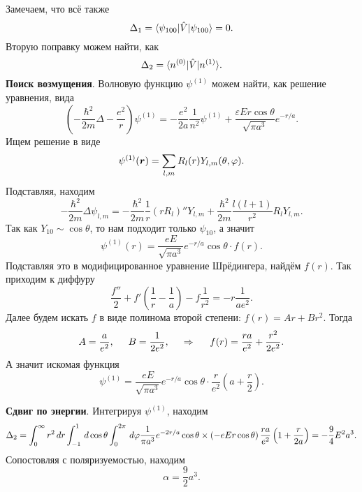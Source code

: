Замечаем, что всё также
\begin{equation*}
    \Delta_1  = \bk{\psi_{100}}[\hat{V}]{\psi_{100}} = 0.
\end{equation*}
Вторую поправку можем найти, как
\begin{equation*}
    \Delta_2 = \bk{n^{(0)}}[\hat{V}]{n^{(1)}}.
\end{equation*}
\textbf{Поиск возмущения}. Волновую функцию $\psi^{(1)}$ можем найти, как решение уравнения, вида
\begin{equation*}
    \left(
        - \frac{\hbar^2}{2m} \Delta - \frac{e^2}{r}
    \right) \psi^{(1)} = - \frac{e^2}{2 a} \frac{1}{n^2} \psi^{(1)} + \frac{\varepsilon E r \cos \theta}{\sqrt{\pi a^3}} e^{-r/a}.
\end{equation*}
Ищем решение в виде
\begin{equation*}
    \psi^{(1)} (\mbox{\boldmath $r$}) = \sum_{l,m} R_l (r) Y_{l,m} (\theta, \varphi).
\end{equation*}
Подставляя, находим
\begin{equation*}
    - \frac{\hbar^2}{2 m} \Delta \psi_{l,m} = - \frac{\hbar^2}{2m } \frac{1}{r} (r R_l)'' Y_{l,m} + \frac{\hbar^2}{2m} \frac{l (l+1)}{r^2} R_l Y_{l,m}.
\end{equation*}
Так как $Y_{10} \sim \cos \theta$, то нам подходит только $\psi_{10}$, а значит
\begin{equation*}
    \psi^{(1)} (r) = \frac{e E}{\sqrt{\pi a^3}} e^{-r/a} \cos \theta \cdot f(r).
\end{equation*}
Подставляя это в модифицированное уравнение Шрёдингера, найдём $f(r)$. Так приходим к диффуру
\begin{equation*}
    \frac{f''}{2} + f'\left(\frac{1}{r}-\frac{1}{a}\right) - f \frac{1}{r^2} = - r \frac{1}{a e^2}.
\end{equation*}
Далее будем искать $f$ в виде полинома второй степени: $f(r) = A r + B r^2$. Тогда
\begin{equation*}
    A = \frac{a}{e^2},
    \hspace{5 mm} 
    B = \frac{1}{2 e^2},
    \hspace{0.5cm} \Rightarrow \hspace{0.5cm}
    f(r) = \frac{r a}{e^2} + \frac{r^2}{2 e^2}.
\end{equation*}
А значит искомая функция
\begin{equation*}
    \psi^{(1)} = \frac{e E}{\sqrt{\pi a^3}} e^{-r/a} \cos \theta \cdot \frac{r}{e^2} \left(a + \frac{r}{2}\right).
\end{equation*}

\textbf{Сдвиг по энергии}. Интегрируя $\psi^{(1)}$, находим
\begin{equation*}
    \Delta_2 = \int_{0}^{\infty} r^2 \, d r \int_{-1}^{1} \, d \cos \theta \int_{0}^{2 \pi} \, d \varphi \frac{1}{\pi a^3} e^{-2r/a} \cos \theta \times 
    \left(- e E r \cos \theta\right) \frac{r a}{e^2} \left(1 + \frac{r}{2a}\right) = - \frac{9}{4}  E^2 a^3.
\end{equation*}
Сопостовляя с поляризуемостью, находим
\begin{equation*}
    \alpha = \frac{9}{2} a^3.
\end{equation*}

